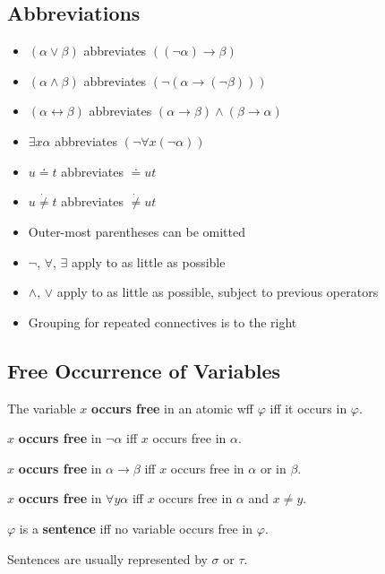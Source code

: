 \subsection{Abbreviations}

\begin{itemize}
    \item $(\alpha\vee\beta)$ abbreviates $((\neg\alpha)\to\beta)$
    \item $(\alpha\wedge\beta)$ abbreviates $(\neg(\alpha \to (\neg\beta)))$
    \item $(\alpha\leftrightarrow\beta)$ abbreviates $(\alpha\to\beta)\wedge(\beta\to\alpha)$
    \item $\exists x\alpha$ abbreviates $(\neg\forall x(\neg\alpha))$
    \item $u\doteq t$ abbreviates $\doteq ut$
    \item $u \dot{\neq} t$ abbreviates $\dot{\neq} ut$
    \item Outer-most parentheses can be omitted
    \item $\neg$, $\forall$, $\exists$ apply to as little as possible
    \item $\wedge$, $\vee$ apply to as little as possible, subject to previous operators
    \item Grouping for repeated connectives is to the right
\end{itemize}

\subsection{Free Occurrence of Variables}

\begin{definition}
    The variable $x$ \textbf{occurs free} in an atomic wff $\varphi$ iff it occurs in $\varphi$.

    $x$ \textbf{occurs free} in $\neg\alpha$ iff $x$ occurs free in $\alpha$.

    $x$ \textbf{occurs free} in $\alpha\to\beta$ iff $x$ occurs free in $\alpha$ or in $\beta$.

    $x$ \textbf{occurs free} in $\forall y \alpha$ iff $x$ occurs free in $\alpha$ and $x \neq y$.
\end{definition}

\begin{definition}[Sentence]
    $\varphi$ is a \textbf{sentence} iff no variable occurs free in $\varphi$.
\end{definition}
\begin{remark}
    Sentences are usually represented by $\sigma$ or $\tau$.
\end{remark}

